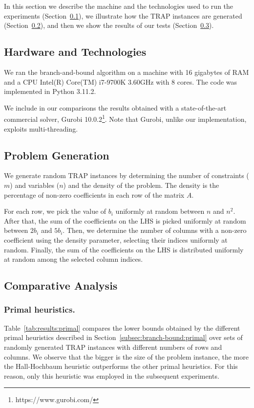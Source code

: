 \documentclass[runningheads]{llncs}
\begin{document}
In this section we describe the machine and the technologies used to run the experiments (Section~\ref{subsec:results:tech}), we illustrate how the TRAP instances are generated (Section~\ref{subsec:results:generation}), and then we show the results of our tests (Section~\ref{subsec:results:comparisons}).  

\subsection{Hardware and Technologies}
\label{subsec:results:tech}

We ran the branch-and-bound algorithm on a machine with 16 gigabytes of RAM and a CPU Intel(R) Core(TM) i7-9700K 3.60GHz with 8 cores. The code was implemented in Python 3.11.2.

We include in our comparisons the results obtained with a state-of-the-art commercial solver, Gurobi 10.0.2\footnote{https://www.gurobi.com/}. Note that Gurobi, unlike our implementation, exploits multi-threading. 


\subsection{Problem Generation}
\label{subsec:results:generation}

We generate random TRAP instances by determining the number of constraints ($m$) and variables ($n$) and the density of the problem. The density is the percentage of non-zero coefficients in each row of the matrix $A$.

For each row, we pick the value of $b_i$ uniformly at random between $n$ and $n^2$. After that, the sum of the coefficients on the LHS is picked uniformly at random between $2b_i$ and $5b_i$. Then, we determine the number of columns with a non-zero coefficient using the density parameter, selecting their indices uniformly at random. Finally, the sum of the coefficients on the LHS is distributed uniformly at random among the selected column indices.

\subsection{Comparative Analysis}
\label{subsec:results:comparisons}

\subsubsection{Primal heuristics.} Table~\ref{tab:results:primal} compares the lower bounds obtained by the different primal heuristics described in Section~\ref{subsec:branch-bound:primal} over sets of randomly generated TRAP instances with different numbers of rows and columns. We observe that the bigger is the size of the problem instance, the more the Hall-Hochbaum heuristic outperforms the other primal heuristics. For this reason, only this heuristic was employed in the subsequent experiments. 
\end{document}

